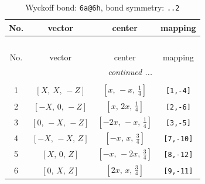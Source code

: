 \documentclass[fleqn,8pt]{jsarticle}
\begin{document}
\begin{longtable}{cccc}
\caption{Wyckoff bond: {\tt 6a@6h}, bond symmetry: {\tt ..2}}
 \\
 \hline \hline
No. & vector & center & mapping \\ \hline \endfirsthead

\multicolumn{3}{l}{\tablename\ \thetable{}} \\
 \hline \hline
No. & vector & center & mapping \\ \hline \endhead

 \hline \hline
\multicolumn{3}{r}{\footnotesize\it continued ...} \\ \endfoot

 \hline \hline
\multicolumn{3}{r}{} \\ \endlastfoot

1 & $\left[ X,\, X,\, - Z \right]$ & $\left[ x,\, - x,\, \frac{1}{4} \right]$ & {\tt [1,-4]} \\ \hline
2 & $\left[ - X,\, 0,\, - Z \right]$ & $\left[ x,\, 2 x,\, \frac{1}{4} \right]$ & {\tt [2,-6]} \\ \hline
3 & $\left[ 0,\, - X,\, - Z \right]$ & $\left[ - 2 x,\, - x,\, \frac{1}{4} \right]$ & {\tt [3,-5]} \\ \hline
4 & $\left[ - X,\, - X,\, Z \right]$ & $\left[ - x,\, x,\, \frac{3}{4} \right]$ & {\tt [7,-10]} \\ \hline
5 & $\left[ X,\, 0,\, Z \right]$ & $\left[ - x,\, - 2 x,\, \frac{3}{4} \right]$ & {\tt [8,-12]} \\ \hline
6 & $\left[ 0,\, X,\, Z \right]$ & $\left[ 2 x,\, x,\, \frac{3}{4} \right]$ & {\tt [9,-11]} \\
\end{longtable}
\renewcommand{\arraystretch}{1.2}
\end{document}
